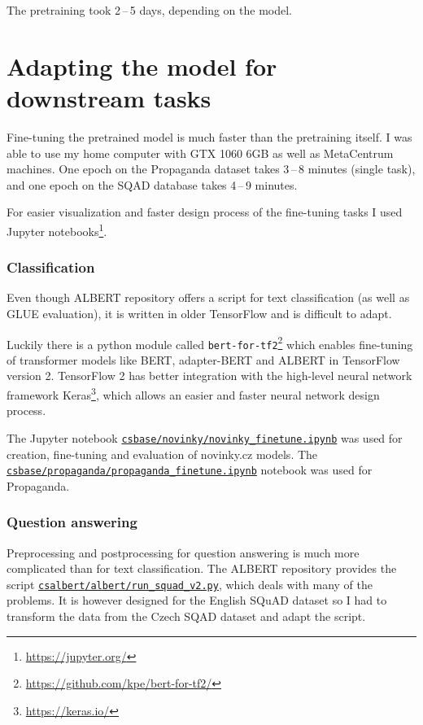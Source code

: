 \documentclass[
  printed, %
  color,   %
  table,   %
  oneside, %
  lof,     %
  lot,     %
]{fithesis3}
\begin{document}
 The pretraining took 2\,--\,5 days, depending on the model. 
 

\section{Adapting the model for downstream tasks}
\label{sec:adapting-finetuning}
Fine-tuning the pretrained model is much faster than the pretraining itself. I was able to use my home computer with GTX 1060 6GB as well as MetaCentrum machines. One epoch on the Propaganda dataset takes 3\,--\,8 minutes (single task), and one epoch on the SQAD database takes 4\,--\,9 minutes.

For easier visualization and faster design process of the fine-tuning tasks I used Jupyter notebooks\footnote{\url{https://jupyter.org/}}.


\subsubsection{Classification}
Even though ALBERT repository offers a script for text classification (as well as GLUE evaluation), it is written in older TensorFlow and is difficult to adapt.

Luckily there is a python module called \texttt{bert-for-tf2}\footnote{\url{https://github.com/kpe/bert-for-tf2/}} which enables fine-tuning of transformer models like BERT, adapter-BERT and ALBERT in TensorFlow version 2. TensorFlow 2 has better integration with the high-level neural network framework Keras\footnote{\url{https://keras.io/}}, which allows an easier and faster neural network design process. 

The Jupyter notebook \href{https://github.com/ZepZep/csalbert/blob/master/novinky/novinky_finetune.ipynb}{\texttt{csbase/novinky/novinky\_finetune.ipynb}} was used for creation, fine-tuning and evaluation of novinky.cz models. The \href{https://github.com/ZepZep/csalbert/blob/master/propaganda/propaganda_finetune.ipynb}{\texttt{csbase/propaganda/propaganda\_finetune.ipynb}} notebook was used for Propaganda.

\subsubsection{Question answering}
Preprocessing and postprocessing for question answering is much more complicated than for text classification. The ALBERT repository provides the script \href{https://github.com/ZepZep/csalbert/blob/master/albert/run_squad_v2.py}{\texttt{csalbert/albert/run\_squad\_v2.py}}, which deals with many of the problems. It is however designed for the English SQuAD dataset so I had to transform the data from the Czech SQAD dataset and adapt the script.
\end{document}
